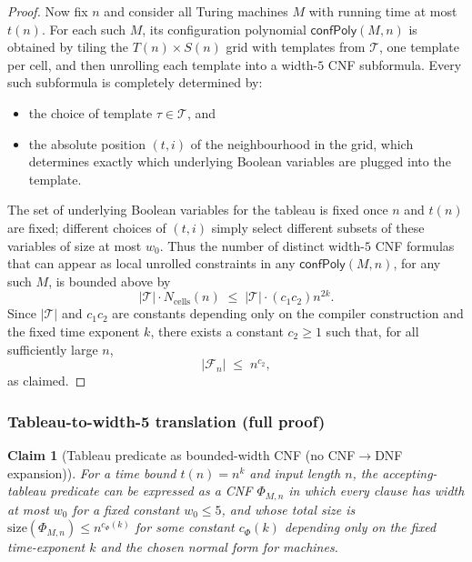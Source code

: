 \documentclass[12pt]{article}
\newtheorem{claim}[theorem]{Claim}
\theoremstyle{definition}
\theoremstyle{definition}
\theoremstyle{remark}
\theoremstyle{remark}
\begin{document}
\begin{proof}
Now fix $n$ and consider all Turing machines $M$ with running time at
most $t(n)$. For each such $M$, its configuration polynomial
$\mathsf{confPoly}(M,n)$ is obtained by tiling the $T(n)\times S(n)$ grid
with templates from $\mathcal{T}$, one template per cell, and then
unrolling each template into a width-$5$ CNF subformula. Every
such subformula is completely determined by:
\begin{itemize}
  \item the choice of template $\tau \in \mathcal{T}$, and
  \item the absolute position $(t,i)$ of the neighbourhood in the grid,
        which determines exactly which underlying Boolean variables are
        plugged into the template.
\end{itemize}
The set of underlying Boolean variables for the tableau is fixed once $n$
and $t(n)$ are fixed; different choices of $(t,i)$ simply select
different subsets of these variables of size at most $w_0$. Thus the
number of distinct width-$5$ CNF formulas that can appear as local
unrolled constraints in any $\mathsf{confPoly}(M,n)$, for any such $M$,
is bounded above by
\[
   |\mathcal{T}| \cdot N_{\mathrm{cells}}(n)
   \;\le\; |\mathcal{T}| \cdot (c_1 c_2) n^{2k}.
\]
Since $|\mathcal{T}|$ and $c_1 c_2$ are constants depending only on the
compiler construction and the fixed time exponent $k$, there exists a
constant $c_2 \ge 1$ such that, for all sufficiently large $n$,
\[
   |\mathcal{F}_n| \;\le\; n^{c_2},
\]
as claimed.
\end{proof}

\subsubsection{Tableau-to-width-5 translation (full proof)}

\begin{claim}[Tableau predicate as bounded-width CNF (no CNF$\to$DNF expansion)]
\label{clm:tableau-width-cnf}
For a time bound $t(n)=n^k$ and input length $n$, the accepting-tableau predicate
can be expressed as a CNF $\Phi_{M,n}$ in which every clause has width at most $w_0$
for a fixed constant $w_0 \le 5$, and whose total size is $\mathrm{size}(\Phi_{M,n}) \le n^{c_\Phi(k)}$
for some constant $c_\Phi(k)$ depending only on the fixed time-exponent $k$ and the
chosen normal form for machines.
\end{claim}
\end{document}
